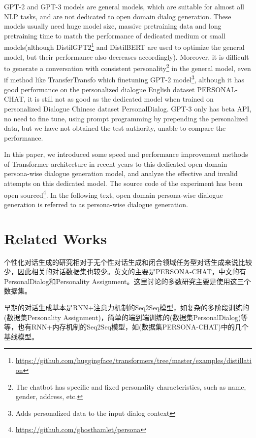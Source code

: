 \documentclass[letterpaper]{article} %
\DeclareRobustCommand{\citeext}[1]{\cite[#1]{#1}}
\begin{document}
\begin{CJK*}{UTF8}{gbsn}
GPT-2 and GPT-3 models are general models, which are suitable for almost all NLP tasks, and are not dedicated to open domain dialog generation. These models usually need huge model size, massive pretraining data and long pretraining time to match the performance of dedicated medium or small models(although DistilGPT2\footnote{\url{https://github.com/huggingface/transformers/tree/master/examples/distillation}} and DistilBERT\citeext{Sanh2019} are used to optimize the general model, but their performance also decreases accordingly). 
Moreover, it is difficult to generate a conversation with consistent personality\footnote{The chatbot has specific and fixed personality characteristics, such as name, gender, address, etc.} in the general model, even if method like TransferTransfo\citeext{Wolf2019} which finetuning GPT-2 model\footnote{Adds personalized data to the input dialog context}, although it has good performance on the personalized dialogue English dataset PERSONAL-CHAT\citeext{Zhang2018}, it is still not as good as the dedicated model\citeext{Zheng2019} when trained on personalized Dialogue Chinese dataset PersonalDialog\citeext{Zheng2019a}. GPT-3 only has beta API, no need to fine tune, using prompt programming by prepending the personalized data, but we have not obtained the test authority, unable to compare the performance. 

In this paper, we introduced some speed and performance improvement methods of Transformer architecture in recent years to this dedicated open domain persona-wise dialogue generation model\citeext{Zheng2019}, and analyze the effective and invalid attempts on this dedicated model. The source code of the experiment has been open sourced\footnote{\url{https://github.com/ghosthamlet/persona}}. In the following text, open domain persona-wise dialogue generation is referred to as persona-wise dialogue generation. 

\section[Related Works]{Related Works} 
个性化对话生成的研究相对于无个性对话生成和闭合领域任务型对话生成来说比较少，因此相关的对话数据集也较少。英文的主要是PERSONA-CHAT\citeext{Zhang2018}，中文的有PersonalDialog\citeext{Zheng2019a}和Personality Assignment\citeext{Qian2017}。这里讨论的多数研究主要是使用这三个数据集。

早期的对话生成基本是RNN+注意力机制\citeext{Bahdanau2015}的Seq2Seq模型\citeext{SutskeverGoogle2014}，如复杂的多阶段训练的\citeext{Qian2017}(数据集Personality Assignment)，简单的端到端训练的\citeext{Zheng2019a}(数据集PersonalDialog)等等，也有RNN+内存机制\citeext{Sukhbaatar2015}的Seq2Seq模型，如\citeext{Zhang2018}(数据集PERSONA-CHAT)中的几个基线模型。


\end{CJK*}
\end{document}
